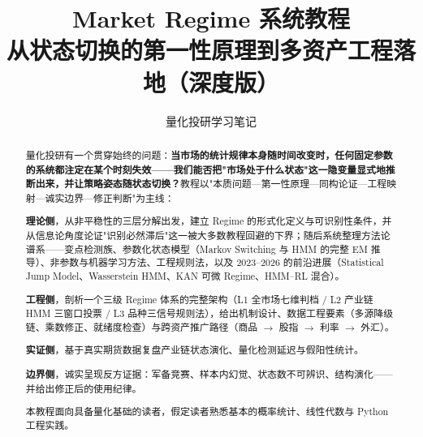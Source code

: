 \documentclass[UTF8,11pt]{ctexart}
\title{\bfseries Market Regime 系统教程\\[3pt]
\large 从状态切换的第一性原理到多资产工程落地（深度版）}
\author{量化投研学习笔记}
\date{}
\theoremstyle{definition}
\theoremstyle{remark}
\begin{document}
\maketitle
\thispagestyle{empty}

\begin{abstract}
\noindent
量化投研有一个贯穿始终的问题：\textbf{当市场的统计规律本身随时间改变时，任何固定参数的系统都注定在某个时刻失效——我们能否把"市场处于什么状态"这一隐变量显式地推断出来，并让策略姿态随状态切换？}教程以"本质问题—第一性原理—同构论证—工程映射—诚实边界—修正判断"为主线：

\textbf{理论侧}，从非平稳性的三层分解出发，建立 Regime 的形式化定义与可识别性条件，并从信息论角度论证"识别必然滞后"这一被大多数教程回避的下界；随后系统整理方法论谱系——变点检测族、参数化状态模型（Markov Switching 与 HMM 的完整 EM 推导）、非参数与机器学习方法、工程规则法，以及 2023--2026 的前沿进展（Statistical Jump Model、Wasserstein HMM、KAN 可微 Regime、HMM--RL 混合）。

\textbf{工程侧}，剖析一个三级 Regime 体系的完整架构（L1 全市场七维判档 / L2 产业链 HMM 三窗口投票 / L3 品种三信号规则法），给出机制设计、数据工程要素（多源降级链、乘数修正、就绪度检查）与跨资产推广路径（商品 $\to$ 股指 $\to$ 利率 $\to$ 外汇）。

\textbf{实证侧}，基于真实期货数据复盘产业链状态演化、量化检测延迟与假阳性统计。

\textbf{边界侧}，诚实呈现反方证据：军备竞赛、样本内幻觉、状态数不可辨识、结构演化——并给出修正后的使用纪律。

本教程面向具备量化基础的读者，假定读者熟悉基本的概率统计、线性代数与 Python 工程实践。
\end{abstract}

\tableofcontents
\newpage












\newpage
\appendix


\newpage
\printbibliography[title={参考文献}]
\end{document}
